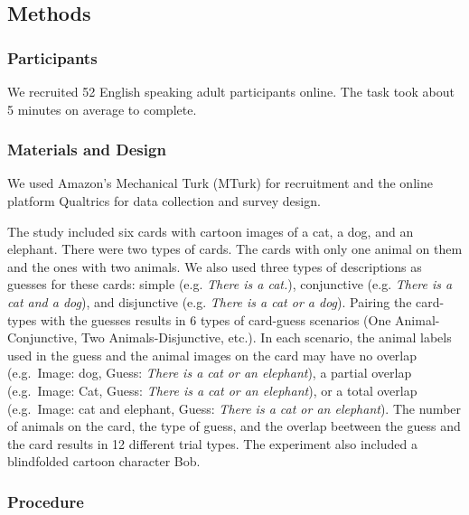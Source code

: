 \documentclass[10pt, letterpaper]{article}
\begin{document}
\subsection{Methods}\label{methods}

\subsubsection{Participants}\label{participants}

We recruited 52 English speaking adult participants online. The task
took about 5 minutes on average to complete.

\subsubsection{Materials and Design}\label{materials-and-design}

We used Amazon's Mechanical Turk (MTurk) for recruitment and the online
platform Qualtrics for data collection and survey design.

The study included six cards with cartoon images of a cat, a dog, and an
elephant. There were two types of cards. The cards with only one animal
on them and the ones with two animals. We also used three types of
descriptions as guesses for these cards: simple (e.g. \emph{There is a
cat.}), conjunctive (e.g. \emph{There is a cat and a dog}), and
disjunctive (e.g. \emph{There is a cat or a dog}). Pairing the
card-types with the guesses results in 6 types of card-guess scenarios
(One Animal-Conjunctive, Two Animals-Disjunctive, etc.). In each
scenario, the animal labels used in the guess and the animal images on
the card may have no overlap (e.g.~Image: dog, Guess: \emph{There is a
cat or an elephant}), a partial overlap (e.g.~Image: Cat, Guess:
\emph{There is a cat or an elephant}), or a total overlap (e.g.~Image:
cat and elephant, Guess: \emph{There is a cat or an elephant}). The
number of animals on the card, the type of guess, and the overlap
beetween the guess and the card results in 12 different trial types. The
experiment also included a blindfolded cartoon character Bob.

\subsubsection{Procedure}\label{procedure}
\end{document}
